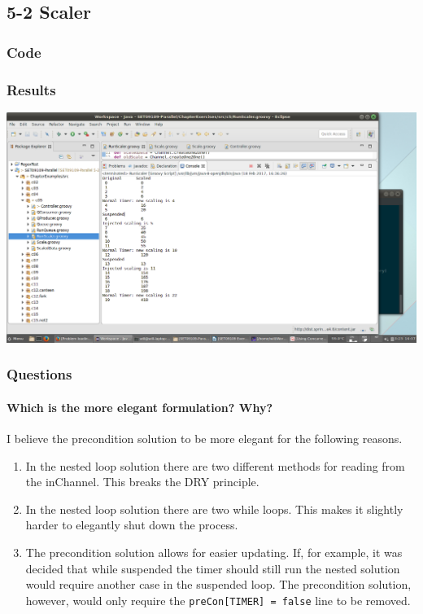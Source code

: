\subsection{5-2 Scaler}

\subsubsection*{Code}



\subsubsection*{Results}

\includegraphics[width=\textwidth]{img/screenshots/5-2.png}

\subsubsection*{Questions}

\paragraph{Which is the more elegant formulation? Why?}

I believe the precondition solution to be more elegant for the following reasons.

\begin{enumerate}
	\item In the nested loop solution there are two different methods for reading from the inChannel.  This breaks the DRY principle.

	\item In the nested loop solution there are two while loops.  This makes it slightly harder to elegantly shut down the process.

	\item The precondition solution allows for easier updating.  If, for example, it was decided that while suspended the timer should still run the nested solution would require another case in the suspended loop.  The precondition solution, however, would only require the \texttt{preCon[TIMER] = false} line to be removed.

\end{enumerate}
